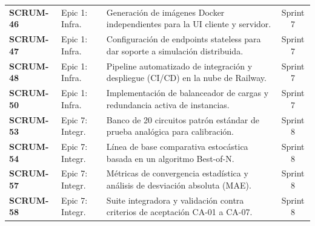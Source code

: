 \documentclass[12pt,letterpaper,oneside]{report}
\begin{document}
\begin{xltabular}{\textwidth}{l p{2.8cm} >{\raggedright\arraybackslash}X c}
\textbf{SCRUM-46} & Epic 1: Infra. & Generación de imágenes Docker independientes para la UI cliente y servidor. & Sprint 7 \\
\textbf{SCRUM-47} & Epic 1: Infra. & Configuración de endpoints stateless para dar soporte a simulación distribuida. & Sprint 7 \\
\textbf{SCRUM-48} & Epic 1: Infra. & Pipeline automatizado de integración y despliegue (CI/CD) en la nube de Railway. & Sprint 7 \\
\textbf{SCRUM-50} & Epic 1: Infra. & Implementación de balanceador de cargas y redundancia activa de instancias. & Sprint 7 \\

\textbf{SCRUM-53} & Epic 7: Integr. & Banco de 20 circuitos patrón estándar de prueba analógica para calibración. & Sprint 8 \\
\textbf{SCRUM-54} & Epic 7: Integr. & Línea de base comparativa estocástica basada en un algoritmo Best-of-N. & Sprint 8 \\
\textbf{SCRUM-57} & Epic 7: Integr. & Métricas de convergencia estadística y análisis de desviación absoluta (MAE). & Sprint 8 \\
\textbf{SCRUM-58} & Epic 7: Integr. & Suite integradora y validación contra criterios de aceptación CA-01 a CA-07. & Sprint 8 \\

\end{xltabular}
\end{document}
